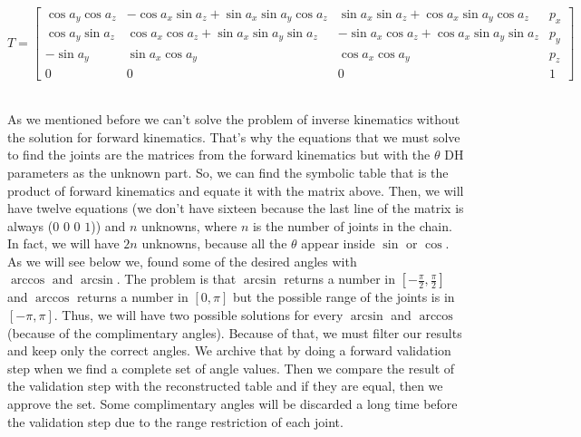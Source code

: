 \begin{scriptsize}
\[
T = 
\begin{bmatrix}
\cos a_y\cos a_z & -\cos a_x\sin a_z + \sin a_x\sin a_y\cos a_z & \sin a_x\sin a_z + \cos a_x\sin a_y\cos a_z & p_x\\
\cos a_y\sin a_z & \cos a_x\cos a_z + \sin a_x\sin a_y\sin a_z & -\sin a_x\cos a_z + \cos a_x\sin a_y\sin a_z & p_y\\
-\sin a_y & \sin a_x\cos a_y & \cos a_x\cos a_y & p_z\\
0 & 0 & 0 & 1
\end{bmatrix}
\]
\end{scriptsize}\\
As we mentioned before we can't solve the problem of inverse kinematics without the solution for forward kinematics. That's why the equations that we must solve to find the joints are the matrices from the forward kinematics but with the \(\theta\) DH parameters as the unknown part. So, we can find the symbolic table that is the product of forward kinematics and equate it with the matrix above. Then, we will have twelve equations (we don't have sixteen because the last line of the matrix is always (\(0\) \(0\) \(0\) \(1\))) and \(n\) unknowns, where \(n\) is the number of joints in the chain. In fact, we will have \(2n\) unknowns, because all the \(\theta\) appear inside \(\sin\) or \(\cos\).\\
As we will see below we, found some of the desired angles with \(\arccos \text{ and }\arcsin\). The problem is that \(\arcsin\) returns a number in \(\left[-\tfrac{\pi}{2},\tfrac{\pi}{2}\right]\) and \(\arccos\) returns a number in \(\left[0,\pi\right]\) but the possible range of the joints is in \(\left[-\pi,\pi\right]\). Thus, we will have two possible solutions for every \(\arcsin\) and \(\arccos\) (because of the complimentary angles). Because of that, we must filter our results and keep only the correct angles. We archive that by doing a forward validation step when we find a complete set of angle values. Then we compare the result of the validation step with the reconstructed table and if they are equal, then we approve the set. Some complimentary angles will be discarded a long time before the validation step due to the range restriction of each joint.

